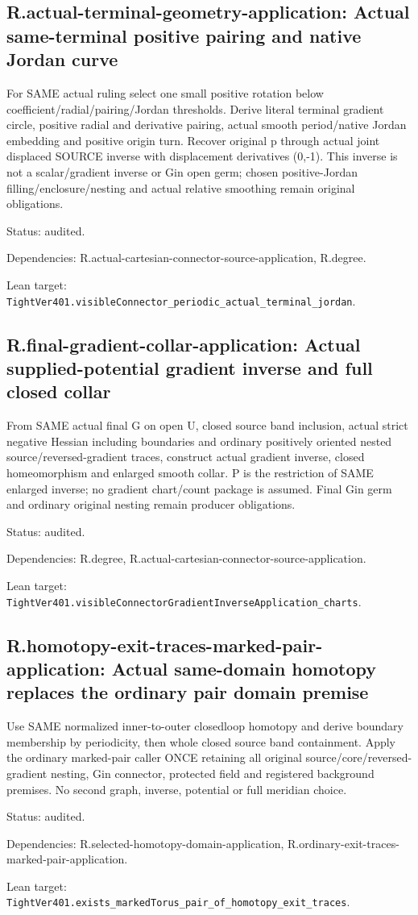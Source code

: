 \documentclass{article}
\begin{document}
\subsection*{R.actual-terminal-geometry-application: Actual same-terminal positive pairing and native Jordan curve}
For SAME actual ruling select one small positive rotation below coefficient/radial/pairing/Jordan thresholds. Derive literal terminal gradient circle, positive radial and derivative pairing, actual smooth period/native Jordan embedding and positive origin turn. Recover original p through actual joint displaced SOURCE inverse with displacement derivatives (0,-1). This inverse is not a scalar/gradient inverse or Gin open germ; chosen positive-Jordan filling/enclosure/nesting and actual relative smoothing remain original obligations.
\par Status: audited.
\par Dependencies: R.actual-cartesian-connector-source-application, R.degree.
\par Lean target: \texttt{TightVer401.visibleConnector\_periodic\_actual\_terminal\_jordan}.
\subsection*{R.final-gradient-collar-application: Actual supplied-potential gradient inverse and full closed collar}
From SAME actual final G on open U, closed source band inclusion, actual strict negative Hessian including boundaries and ordinary positively oriented nested source/reversed-gradient traces, construct actual gradient inverse, closed homeomorphism and enlarged smooth collar. P is the restriction of SAME enlarged inverse; no gradient chart/count package is assumed. Final Gin germ and ordinary original nesting remain producer obligations.
\par Status: audited.
\par Dependencies: R.degree, R.actual-cartesian-connector-source-application.
\par Lean target: \texttt{TightVer401.visibleConnectorGradientInverseApplication\_charts}.
\subsection*{R.homotopy-exit-traces-marked-pair-application: Actual same-domain homotopy replaces the ordinary pair domain premise}
Use SAME normalized inner-to-outer closedloop homotopy and derive boundary membership by periodicity, then whole closed source band containment. Apply the ordinary marked-pair caller ONCE retaining all original source/core/reversed-gradient nesting, Gin connector, protected field and registered background premises. No second graph, inverse, potential or full meridian choice.
\par Status: audited.
\par Dependencies: R.selected-homotopy-domain-application, R.ordinary-exit-traces-marked-pair-application.
\par Lean target: \texttt{TightVer401.exists\_markedTorus\_pair\_of\_homotopy\_exit\_traces}.
\end{document}
